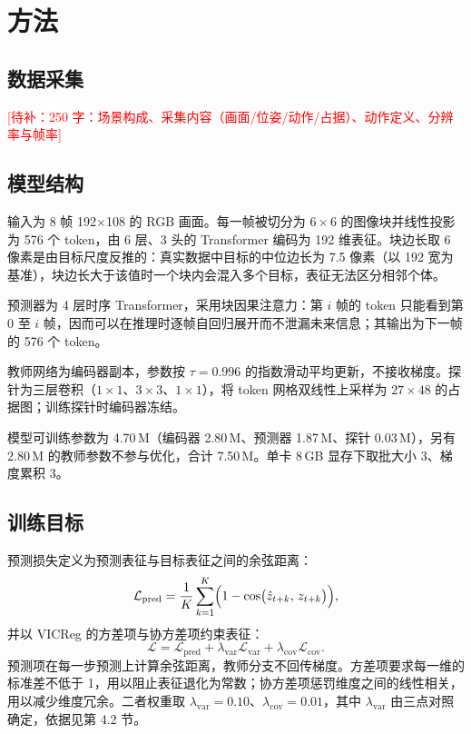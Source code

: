 \documentclass[12pt,a4paper]{ctexart}
\newcommand{\todo}[1]{\textcolor{red}{[待补：#1]}}
\let\origcite\cite
\renewcommand{\cite}[2][]{\nobreak\mbox{\origcite[#1]{#2}}}
\begin{document}
\section{方法}

\subsection{数据采集}
\todo{250 字：场景构成、采集内容（画面/位姿/动作/占据）、动作定义、分辨率与帧率}

\subsection{模型结构}

输入为 8 帧 192$\times$108 的 RGB 画面。每一帧被切分为 $6\times6$ 的图像块并线性投影为 576 个 token\cite{dosovitskiy2021vit}，由 6 层、3 头的 Transformer 编码为 192 维表征。块边长取 6 像素是由目标尺度反推的：真实数据中目标的中位边长为 7.5 像素（以 192 宽为基准），块边长大于该值时一个块内会混入多个目标，表征无法区分相邻个体。

预测器为 4 层时序 Transformer，采用块因果注意力：第 $i$ 帧的 token 只能看到第 $0$ 至 $i$ 帧，因而可以在推理时逐帧自回归展开而不泄漏未来信息；其输出为下一帧的 576 个 token。

教师网络为编码器副本，参数按 $\tau=0.996$ 的指数滑动平均更新，不接收梯度。探针为三层卷积（$1\times1$、$3\times3$、$1\times1$），将 token 网格双线性上采样为 $27\times48$ 的占据图；训练探针时编码器冻结。

模型可训练参数为 4.70\,M（编码器 2.80\,M、预测器 1.87\,M、探针 0.03\,M），另有 2.80\,M 的教师参数不参与优化，合计 7.50\,M。单卡 8\,GB 显存下取批大小 3、梯度累积 3。

\subsection{训练目标}
预测损失定义为预测表征与目标表征之间的余弦距离：
\begin{equation}
\mathcal{L}_{\text{pred}} = \frac{1}{K}\sum_{k=1}^{K}\Bigl(1-\cos\bigl(\hat{z}_{t+k},\,z_{t+k}\bigr)\Bigr),
\end{equation}
并以 VICReg\cite{bardes2022vicreg} 的方差项与协方差项约束表征：
\begin{equation}
\mathcal{L} = \mathcal{L}_{\text{pred}} + \lambda_{\text{var}}\mathcal{L}_{\text{var}} + \lambda_{\text{cov}}\mathcal{L}_{\text{cov}}.
\end{equation}
预测项在每一步预测上计算余弦距离，教师分支不回传梯度。方差项要求每一维的标准差不低于 1，用以阻止表征退化为常数；协方差项惩罚维度之间的线性相关，用以减少维度冗余。二者权重取 $\lambda_{\text{var}}=0.10$、$\lambda_{\text{cov}}=0.01$，其中 $\lambda_{\text{var}}$ 由三点对照确定，依据见第 4.2 节。
\end{document}
